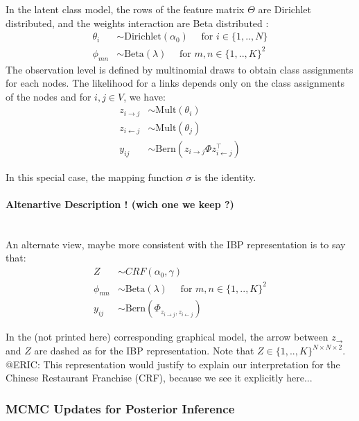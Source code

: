 In the latent class model, the rows of the feature matrix $\Theta$ are Dirichlet distributed, and the weights interaction are Beta distributed : 
\begin{align}
\theta_i &\sim \mathrm{Dirichlet}(\alpha_0) \quad\text{ for }  i \in \{1, .., N\} \\
\phi_{mn} &\sim \mathrm{Beta}(\lambda) \quad\text{ for }  m,n \in \{1, .., K\}^2 
\end{align}
The observation level is defined by multinomial draws to obtain class assignments for each nodes. The likelihood for a links depends only on the class assignments of the nodes  and for $i, j \in V$, we have:  
\begin{align}
z_{i\rightarrow j} &\sim \mathrm{Mult}(\theta_i) \\
z_{i\leftarrow j} &\sim \mathrm{Mult}(\theta_j) \\
y_{ij} &\sim \mathrm{Bern}(z_{i\rightarrow j} \Phi z_{i\leftarrow j}^\top)
\end{align}

In this special case, the mapping function $\sigma$ is the identity.

\paragraph{Altenartive Description ! (wich one we keep ?)}~\\

An alternate view, maybe more consistent with the IBP representation is to say that:
\begin{align}
Z &\sim CRF(\alpha_0, \gamma) \\
\phi_{mn} &\sim \mathrm{Beta}(\lambda) \quad\text{ for }  m,n \in \{1, .., K\}^2  \\
y_{ij} &\sim \mathrm{Bern}(\Phi_{z_{i\rightarrow j} , z_{i\leftarrow j}})
\end{align}

In the (not printed here) corresponding graphical model, the arrow between $z_{\rightarrow}$ and $Z$ are dashed as for the IBP representation. Note that $Z \in \{1,.., K\}^{N\times N \times 2}$. ~\\

@ERIC: This representation would justify to explain our interpretation for the Chinese Restaurant Franchise (CRF), because we see it explicitly here...

\subsubsection{MCMC Updates for Posterior Inference}~\\

